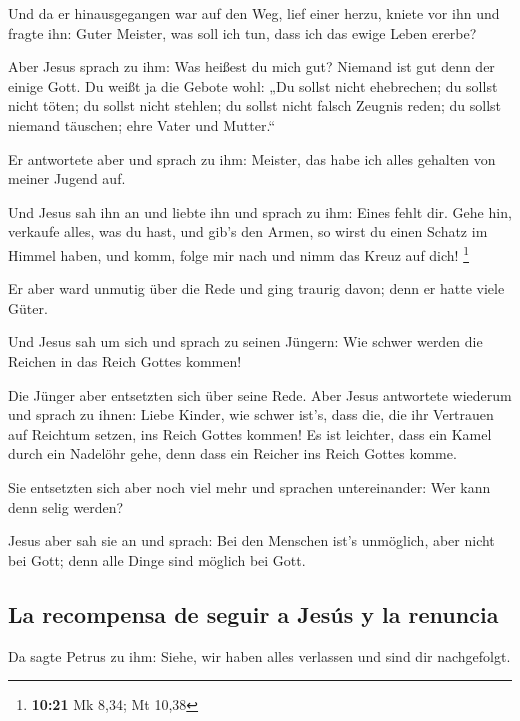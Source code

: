  Und da er hinausgegangen war auf den Weg, lief einer
herzu, kniete vor ihn und fragte ihn: Guter Meister, was soll ich tun,
dass ich das ewige Leben ererbe?

 Aber Jesus sprach zu ihm: Was heißest du mich gut?
Niemand ist gut denn der einige Gott.  Du weißt ja die
Gebote wohl: „Du sollst nicht ehebrechen; du sollst nicht töten; du
sollst nicht stehlen; du sollst nicht falsch Zeugnis reden; du sollst
niemand täuschen; ehre Vater und Mutter.``

 Er antwortete aber und sprach zu ihm: Meister, das habe
ich alles gehalten von meiner Jugend auf.

 Und Jesus sah ihn an und liebte ihn und sprach zu ihm:
Eines fehlt dir. Gehe hin, verkaufe alles, was du hast, und gib's den
Armen, so wirst du einen Schatz im Himmel haben, und komm, folge mir
nach und nimm das Kreuz auf dich! \footnote{\textbf{10:21} Mk 8,34; Mt
  10,38}

 Er aber ward unmutig über die Rede und ging traurig
davon; denn er hatte viele Güter.

 Und Jesus sah um sich und sprach zu seinen Jüngern: Wie
schwer werden die Reichen in das Reich Gottes kommen!

 Die Jünger aber entsetzten sich über seine Rede. Aber
Jesus antwortete wiederum und sprach zu ihnen: Liebe Kinder, wie schwer
ist's, dass die, die ihr Vertrauen auf Reichtum setzen, ins Reich Gottes
kommen!  Es ist leichter, dass ein Kamel durch ein
Nadelöhr gehe, denn dass ein Reicher ins Reich Gottes komme.

 Sie entsetzten sich aber noch viel mehr und sprachen
untereinander: Wer kann denn selig werden?

 Jesus aber sah sie an und sprach: Bei den Menschen ist's
unmöglich, aber nicht bei Gott; denn alle Dinge sind möglich bei Gott.

\hypertarget{la-recompensa-de-seguir-a-jesuxfas-y-la-renuncia}{%
\subsection{La recompensa de seguir a Jesús y la
renuncia}\label{la-recompensa-de-seguir-a-jesuxfas-y-la-renuncia}}

 Da sagte Petrus zu ihm: Siehe, wir haben alles verlassen
und sind dir nachgefolgt.

